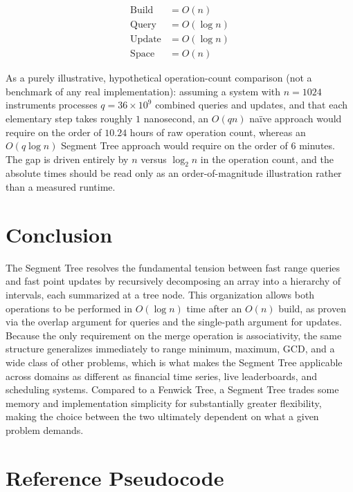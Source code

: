 \documentclass[11pt,open=any]{scrreprt}
\begin{document}
\begin{equation}
\boxed{
\begin{aligned}
\text{Build} &= O(n) \\
\text{Query} &= O(\log n) \\
\text{Update} &= O(\log n) \\
\text{Space} &= O(n)
\end{aligned}}
\end{equation}

As a purely illustrative, hypothetical operation-count comparison (not a benchmark of any real implementation): assuming a system with $n = 1024$ instruments processes $q = 36 \times 10^9$ combined queries and updates, and that each elementary step takes roughly $1$ nanosecond, an $O(qn)$ na\"ive approach would require on the order of $10.24$ hours of raw operation count, whereas an $O(q \log n)$ Segment Tree approach would require on the order of $6$ minutes. The gap is driven entirely by $n$ versus $\log_2 n$ in the operation count, and the absolute times should be read only as an order-of-magnitude illustration rather than a measured runtime.

\chapter{Conclusion}

The Segment Tree resolves the fundamental tension between fast range queries and fast point updates by recursively decomposing an array into a hierarchy of intervals, each summarized at a tree node. This organization allows both operations to be performed in $O(\log n)$ time after an $O(n)$ build, as proven via the overlap argument for queries and the single-path argument for updates. Because the only requirement on the merge operation is associativity, the same structure generalizes immediately to range minimum, maximum, GCD, and a wide class of other problems, which is what makes the Segment Tree applicable across domains as different as financial time series, live leaderboards, and scheduling systems. Compared to a Fenwick Tree, a Segment Tree trades some memory and implementation simplicity for substantially greater flexibility, making the choice between the two ultimately dependent on what a given problem demands.

\appendix
\chapter{Reference Pseudocode}
\end{document}
